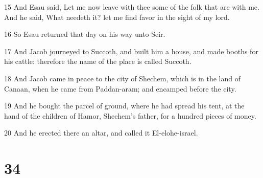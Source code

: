 \par 15 And Esau said, Let me now leave with thee some of the folk that are with me. And he said, What needeth it? let me find favor in the sight of my lord.
\par 16 So Esau returned that day on his way unto Seir.
\par 17 And Jacob journeyed to Succoth, and built him a house, and made booths for his cattle: therefore the name of the place is called Succoth.
\par 18 And Jacob came in peace to the city of Shechem, which is in the land of Canaan, when he came from Paddan-aram; and encamped before the city.
\par 19 And he bought the parcel of ground, where he had spread his tent, at the hand of the children of Hamor, Shechem's father, for a hundred pieces of money.
\par 20 And he erected there an altar, and called it El-elohe-israel.

\chapter{34}

